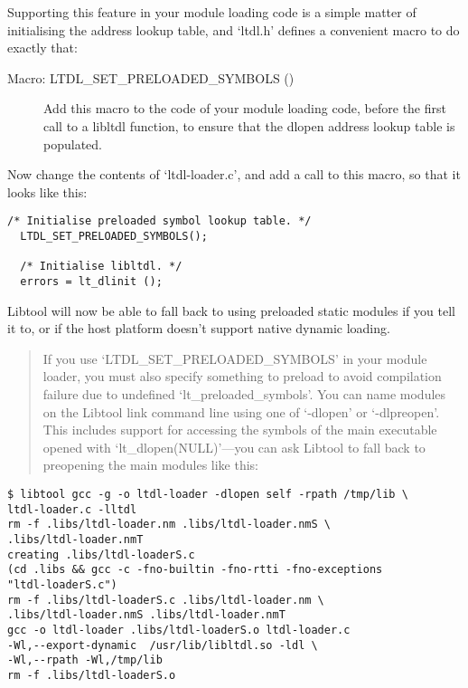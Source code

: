 Supporting this feature in your module loading code is a simple matter of initialising the address lookup table, and `ltdl.h' defines a convenient macro to do exactly that: 

\begin{description}
\item[Macro: LTDL\_{}SET\_{}PRELOADED\_{}SYMBOLS ()]
    Add this macro to the code of your module loading code, before the first call to a libltdl function, to ensure that the dlopen address lookup table is populated. 
\end{description}

Now change the contents of `ltdl-loader.c', and add a call to this macro, so that it looks like this: 

\begin{Verbatim}[frame=single]
  /* Initialise preloaded symbol lookup table. */
  LTDL_SET_PRELOADED_SYMBOLS();

  /* Initialise libltdl. */
  errors = lt_dlinit ();
\end{Verbatim}

Libtool will now be able to fall back to using preloaded static modules if you tell it to, or if the host platform doesn't support native dynamic loading.

\begin{quote}
If you use `LTDL\_{}SET\_{}PRELOADED\_{}SYMBOLS' in your module loader, you must also specify something to preload to avoid compilation failure due to undefined `lt\_{}preloaded\_{}symbols'. You can name modules on the Libtool link command line using one of `-dlopen' or `-dlpreopen'. This includes support for accessing the symbols of the main executable opened with `lt\_{}dlopen(NULL)'---you can ask Libtool to fall back to preopening the main modules like this:
\end{quote}

\begin{Verbatim}[frame=single]
$ libtool gcc -g -o ltdl-loader -dlopen self -rpath /tmp/lib \
ltdl-loader.c -lltdl
rm -f .libs/ltdl-loader.nm .libs/ltdl-loader.nmS \
.libs/ltdl-loader.nmT
creating .libs/ltdl-loaderS.c
(cd .libs && gcc -c -fno-builtin -fno-rtti -fno-exceptions
"ltdl-loaderS.c")
rm -f .libs/ltdl-loaderS.c .libs/ltdl-loader.nm \
.libs/ltdl-loader.nmS .libs/ltdl-loader.nmT
gcc -o ltdl-loader .libs/ltdl-loaderS.o ltdl-loader.c
-Wl,--export-dynamic  /usr/lib/libltdl.so -ldl \
-Wl,--rpath -Wl,/tmp/lib
rm -f .libs/ltdl-loaderS.o
\end{Verbatim}

